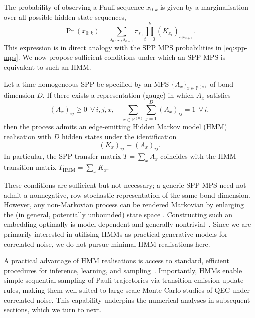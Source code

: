 The probability of observing a Pauli sequence \(x_{0:k}\) is given by a marginalisation over all possible hidden state sequences,
\begin{equation}
    \Pr(x_{0:k}) = \sum_{s_0,\dots,s_{k+1}} \pi_{s_0} \prod_{t=0}^k (K_{x_t})_{s_t s_{t+1}}.
\end{equation}
This expression is in direct analogy with the SPP MPS probabilities in \cref{eq:spp-mps}. We now propose sufficient conditions under which an SPP MPS is equivalent to such an HMM.
\begin{proposition}
    Let a time-homogeneous SPP be specified by an MPS \(\{A_x\}_{x\in\mathbb P^{(n)}}\) of bond dimension \(D\). If there exists a representation (gauge) in which \(A_x\) satisfies
    \begin{equation}
        (A_x)_{ij}\ge 0 \ \ \forall\, i,j,x, \quad
        \sum_{x\in\mathbb{P}^{(n)}}\sum_{j=1}^{D} (A_x)_{ij}=1 \ \ \forall\, i,
    \end{equation}
    then the process admits an edge-emitting Hidden Markov model (HMM) realisation with \(D\) hidden states under the identification
    \begin{equation}
        (K_x)_{ij}\equiv(A_x)_{ij}.
    \end{equation}
    In particular, the SPP transfer matrix \(T = \sum_x A_x\) coincides with the HMM transition matrix \(T_{\mathrm{HMM}} = \sum_x K_x\).
\end{proposition}

These conditions are sufficient but not necessary; a generic SPP MPS need not admit a nonnegative, row-stochastic representation of the same bond dimension. However, any non-Markovian process can be rendered Markovian by enlarging the (in general, potentially unbounded) state space \cite{milzQuantumStochasticProcesses2021}. Constructing such an embedding optimally is model dependent and generally nontrivial~\cite{vidyasagarCompleteRealizationProblem2011}. Since we are primarily interested in utilising HMMs as practical generative models for correlated noise, we do not pursue minimal HMM realisations here.

A practical advantage of HMM realisations is access to standard, efficient procedures for inference, learning, and sampling~\cite{leonarde.baumMaximizationTechniqueOccurring1970}. Importantly, HMMs enable simple sequential sampling of Pauli trajectories via transition-emission update rules, making them well suited to large-scale Monte Carlo studies of QEC under correlated noise. This capability underpins the numerical analyses in subsequent sections, which we turn to next.

